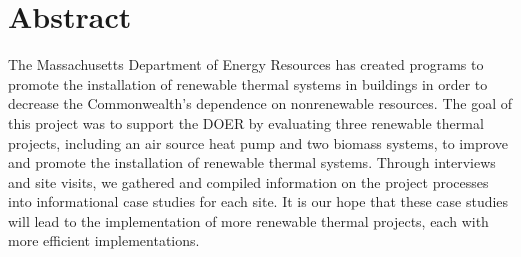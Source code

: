 \chapter*{Abstract}
%

\par The Massachusetts Department of Energy Resources has created programs to promote the installation of renewable thermal systems in buildings in order to decrease the Commonwealth’s dependence on nonrenewable resources. The goal of this project was to support the DOER by evaluating three renewable thermal projects, including an air source heat pump and two biomass systems, to improve and promote the installation of renewable thermal systems. Through interviews and site visits, we gathered and compiled information on the project processes into informational case studies for each site. It is our hope that these case studies will lead to the implementation of more renewable thermal projects, each with more efficient implementations.